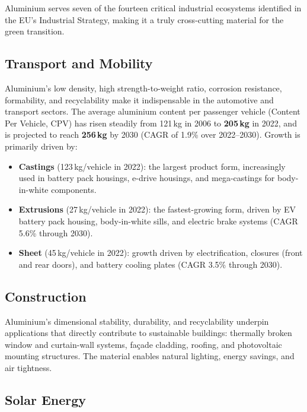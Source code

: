 Aluminium serves seven of the fourteen critical industrial ecosystems identified in the EU's
Industrial Strategy, making it a truly cross-cutting material for the green transition.

\subsection{Transport and Mobility}

Aluminium's low density, high strength-to-weight ratio, corrosion resistance, formability, and
recyclability make it indispensable in the automotive and transport sectors. The average aluminium
content per passenger vehicle (Content Per Vehicle, CPV) has risen steadily from 121\,kg in 2006
to \textbf{205\,kg} in 2022, and is projected to reach \textbf{256\,kg} by 2030 (CAGR of 1.9\%
over 2022--2030). Growth is primarily driven by:

\begin{itemize}
    \item \textbf{Castings} (123\,kg/vehicle in 2022): the largest product form, increasingly used
          in battery pack housings, e-drive housings, and mega-castings for body-in-white
          components.
    \item \textbf{Extrusions} (27\,kg/vehicle in 2022): the fastest-growing form, driven by EV
          battery pack housing, body-in-white sills, and electric brake systems (CAGR 5.6\%
          through 2030).
    \item \textbf{Sheet} (45\,kg/vehicle in 2022): growth driven by electrification, closures
          (front and rear doors), and battery cooling plates (CAGR 3.5\% through 2030).
\end{itemize}

\subsection{Construction}

Aluminium's dimensional stability, durability, and recyclability underpin applications that directly
contribute to sustainable buildings: thermally broken window and curtain-wall systems, façade
cladding, roofing, and photovoltaic mounting structures. The material enables natural lighting,
energy savings, and air tightness.

\subsection{Solar Energy}

